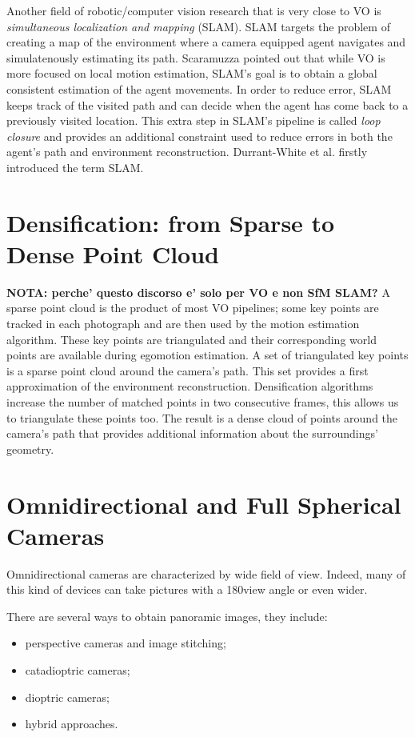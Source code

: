 Another field of robotic/computer vision research that is very close to VO is \textit{simultaneous localization and mapping} (SLAM). SLAM targets the problem of creating a map of the environment where a camera equipped agent navigates and simulatenously estimating its path. Scaramuzza\cite{scaramuzzaVisualOdometryI} pointed out that while VO is more focused on local motion estimation, SLAM's goal is to obtain a global consistent estimation of the agent movements.
%
In order to reduce error, SLAM keeps track of the visited path and can decide when the agent has come back to a previously visited location. This extra step in SLAM's pipeline is called \textit{loop closure} and provides an additional constraint used to reduce errors in both the agent's path and 
environment reconstruction. Durrant-White et al.\cite{durrant1996localization} firstly introduced the term SLAM.

%
%
 
\section{Densification: from Sparse to Dense Point Cloud}
\textbf{NOTA: perche' questo discorso e' solo per VO e non SfM SLAM?}
A sparse point cloud is the product of most VO pipelines; some key points are tracked in each photograph and are then used by the motion estimation algorithm. These key points are triangulated and their corresponding world points are available during egomotion estimation.
%
A set of triangulated key points is a sparse point cloud around the camera's path. This set provides a first approximation of the environment reconstruction.
Densification algorithms increase the number of matched points in two consecutive frames, this allows us to triangulate these points too. The result is a dense cloud of points around the camera's path that provides additional information about the surroundings' geometry.

\section{Omnidirectional and Full Spherical Cameras}
\label{sec:cameraclassification}
Omnidirectional cameras are characterized by wide field of view. Indeed, many of this kind of devices can take pictures with a 180\degree view angle or even wider.

There are several ways to obtain panoramic images, they include:
\begin{itemize}
	\item perspective cameras and image stitching;
	\item catadioptric cameras;
	\item dioptric cameras;
	\item hybrid approaches.
\end{itemize}

